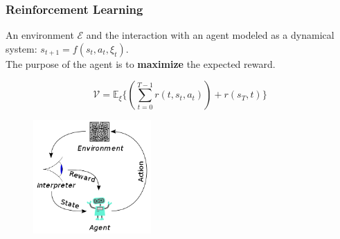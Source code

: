 \documentclass{beamer}
\begin{document}
\begin{frame}
\frametitle{Reinforcement Learning}
	An environment $\mathcal{E}$ and the interaction with an agent modeled as a dynamical system: $s_{t+1} = f(s_t, a_t, \xi_t )$.\\ The purpose of the agent is to \textbf{maximize} the expected reward.
	
	\begin{equation}
\mathcal{V} = \mathbb{E}_\xi \{ (\sum_{t=0}^{T-1} r(t, s_t, a_t)) + r(s_T,t) \} %
	\end{equation}
	
\begin{figure}[H]
	\centering
	\includegraphics[width=0.4\textwidth]{reinforcement}
	\label{fig:rl}
\end{figure}


\end{frame}
\end{document}
